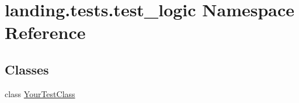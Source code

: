 \hypertarget{namespacelanding_1_1tests_1_1test__logic}{}\section{landing.\+tests.\+test\+\_\+logic Namespace Reference}
\label{namespacelanding_1_1tests_1_1test__logic}
\subsection*{Classes}
\begin{DoxyCompactItemize}
\item 
class \mbox{\hyperlink{classlanding_1_1tests_1_1test__logic_1_1YourTestClass}{Your\+Test\+Class}}
\end{DoxyCompactItemize}
